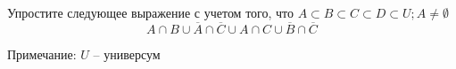 \question
Упростите следующее выражение с учетом того, что $A\subset B \subset C \subset D \subset U; A \neq \emptyset$
\begin{equation*}
	A \cap B \cup \overline{A} \cap \overline{C} \cup A \cap C \cup \overline{B} \cap \overline{C}
\end{equation*}

Примечание: $U$ -- универсум